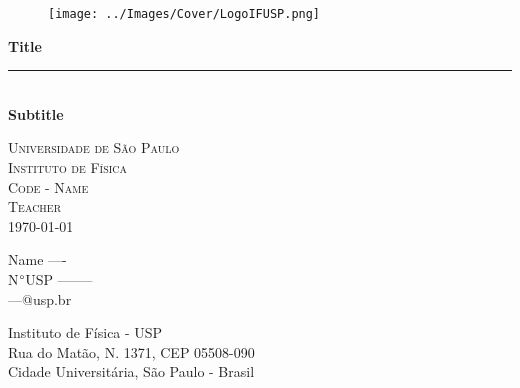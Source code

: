 \thispagestyle{plain}
\BgThispage

\newcommand{\titulo}{\textbf{Title}} %
\newcommand{\subtitulo}{\textbf{Subtitle}} %
\newcommand{\disciplina}{Code - Name} %
\newcommand{\prof}{Teacher} %
\newcommand{\data}{\today} %
\newcommand{\eu}{Name ----} %
\newcommand{\nusp}{N$\degree$USP --------} %
\newcommand{\email}{---@usp.br} %
\newcommand{\orgao}{Universidade de São Paulo} %
\newcommand{\instituto}{Instituto de Física} %

\begin{figure}[h]
\centering
  \texttt{[image: ../Images/Cover/LogoIFUSP.png]}
  \label{fig:LogoIFUSP}
\end{figure}

\begin{center}
\vfill
{\Huge{\textcolor{corIFUSP}{\titulo}}}\\
\vspace{0.5ex}
\rule[1ex]{0.25\textwidth}{1pt}\\
{\LARGE{\textcolor{corIFUSP}{\subtitulo}}}\\
\end{center}


\begin{center}
    \large{
    \textsc{
    \orgao \\
    \instituto \\
    \disciplina\\
    \prof\\
    \data
    }
    }
\vfill
\end{center}


\begin{flushright}
    \large{
    \eu \\
    \nusp \\
    \email
    }
\end{flushright}
\vfill


\begin{center}
    Instituto de Física - USP\\
    Rua do Matão, N. 1371, CEP 05508-090\\
    Cidade Universitária, São Paulo - Brasil\\
\end{center}


\newpage
\thispagestyle{plain}
\tableofcontents


\newpage
\pagestyle{fancy}
